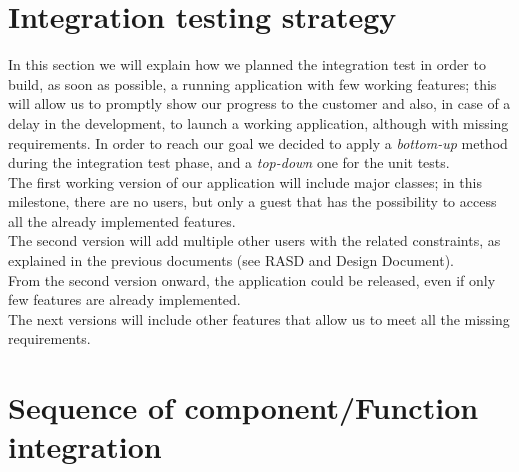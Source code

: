 \section{Integration testing strategy}
In this section we will explain how we planned the integration test
in order to build, as soon as possible, a running application 
with few working features; this will allow us to promptly show
our progress to the customer and also, in case of a delay in the development, 
to launch a working application, although with missing requirements.
In order to reach our goal we decided to apply a \textit{bottom-up} method
during the integration test phase, and a \textit{top-down} one for the unit tests.\\
The first working version of our application will include major classes;
in this milestone, there are no users, but only a guest that has the possibility  %
to access all the already implemented features.\\
The second version will add multiple other users with the related constraints,
as explained in the previous documents (see RASD and Design Document).\\
From the second version onward, the application could be released,
even if only few features are already implemented.\\
The next versions will include other features that allow us to meet  %
all the missing requirements.

\section{Sequence of component/Function integration}

